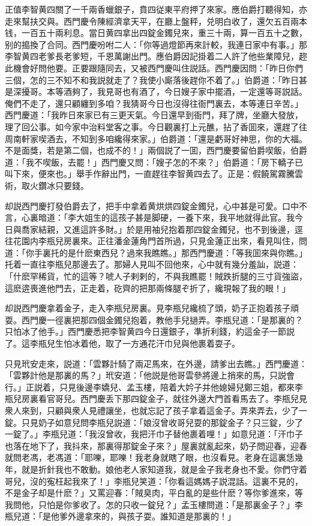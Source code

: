 正值李智黄四關了一千兩香蠟銀子，賁四従東平府押了來家。應伯爵打聽得知，亦走來幫扶交與。西門慶令陳經濟拿天平，在廳上盤秤，兑明白收了，還欠五百兩本钱，一百五十兩利息。當日黄四拿出四錠金鐲兒來，重三十兩，算一百五十之數，别的搗換了合同。西門慶吩咐二人：「你等過燈節再來計較，我連日家中有事。」那李智黄四老爹長老爹短，千恩萬謝出門。應伯爵因記掛着二人許了他些業障兒，趂此機會好問他要。正要跟隨同去，又被西門慶叫住説話。西門慶因問：「昨日你們三個，怎的三不知不和我説就走了？我使小廝落後趕你不着了。」伯爵道：「昨日甚是深擾哥。本等酒夠了，我見哥也有酒了，今日嫂子家中擺酒，一定還等哥説話。俺們不走了，還只顧纏到多咱？我猜哥今日也沒得往衙門裏去，本等連日辛苦。」西門慶道：「我昨日來家已有三更天氣。今日還早到衙門，拜了牌，坐廳大發放，理了回公事。如今家中治料堂客之事。今日觀裏打上元醮，拈了香囬來，還趕了往周南軒家喫酒去，不知到多咱纔得來家。」伯爵道：「還是虧哥好神思，你的大福。不是面獎，若是第二個，也成不的！」兩個説了一囬，西門慶要留伯爵喫飯，伯爵道：「我不喫飯，去罷！」西門慶又問：「嫂子怎的不來？」伯爵道：「房下轎子已叫下來，便來也。」舉手作辭出門，一直趕往李智黄四去了。正是：假饒駕霧騰雲術，取火鑽冰只要錢。

却説西門慶打發伯爵去了，把手中拿着黄烘烘四錠金鐲兒，心中甚是可愛。口中不言，心裏暗道：「李大姐生的這孩子甚是脚硬，一養下來，我平地就得此官。我今日與喬家結親，又進這許多財。」於是用袖兒抱着那四錠金鐲兒，也不到後邊，逕往花園内李瓶兒房裏來。正往潘金蓮角門首所過，只見金蓮正出來，看見叫住，問道：「你手裏托的是什麽東西兒？過來我瞧瞧。」那西門慶道：「等我囬來與你瞧。」托着一直往李瓶兒那邊去了。那婦人見叫不回他來，心中就有幾分羞訕，説道：「什麽罕稀貨，忙的這等？唬人子剌剌的，不與我瞧罷！賊跌折腿的三寸貨強盜，這麽逩喪進他門去，正走着，矻齊的把那兩條腿ぞ折了，纔現報了我的眼！」

却説西門慶拿着金子，走入李瓶兒房裏。見李瓶兒纔梳了頭，奶子正抱着孩子頑耍。西門慶一徑裏把那四個金鐲兒抱着，教他手兒撾弄。李瓶兒道：「是那裏的？只怕冰了他手。」西門慶悉把李智黄四今日還銀子，準折利錢，約這金子一節説了。這李瓶兒生怕冰着他，取了一方通花汗巾兒與他裹着耍子。

只見玳安走來，説道：「雲夥計騎了兩疋馬來，在外邊，請爹出去瞧。」西門慶道：「雲夥計他是那裏的馬？」玳安道：「他説是他哥雲參將邊上捎來的馬，只説會行。」正説着，只見後邊李嬌兒、孟玉樓，陪着大妗子并他媳婦兒鄭三姐，都來李瓶兒房裏看官哥兒。西門慶丢下那四錠金子，就往外邊大門首看馬去了。李瓶兒見衆人來到，只顧與衆人見禮讓坐，也就忘記了孩子拿着這金子。弄來弄去，少了一錠。只見奶子如意兒問李瓶兒説道：「娘沒曾收哥兒耍的那錠金子？只三錠，少了一錠了。」李瓶兒道：「我沒曾收，我把汗巾子替他裹着哩！」如意兒道：「汗巾子也落在地下了，我抖來，那裏得那錠金子來？」屋裏就亂起來，奶子問迎春，迎春就問老馮，老馮道：「耶嚛，耶嚛！我老身就瞎了眼，也沒看見。老身在這裏恁幾年，就是折針我也不敢動。娘他老人家知道我，就是金子我老身也不愛。你們守着哥兒，沒的寃枉起我來了！」李瓶兒笑道：「你看這媽媽子説混話。這裏不見的，不是金子却是什麽？」又罵迎春：「賊臭肉，平白亂的是些什麽？等你爹進來，等我問他，只怕是你爹收了。怎的只收一錠兒？」孟玉樓問道：「是那裏金子？」李瓶兒道：「是他爹外邊拿來的，與孩子耍。誰知道是那裏的！」

